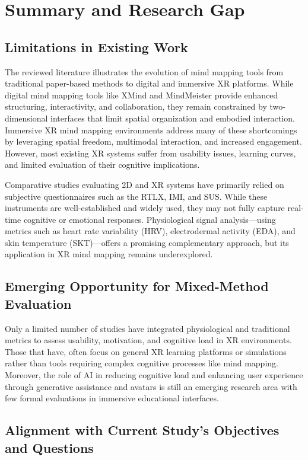 \documentclass{CPP}
\begin{document}
\section{Summary and Research Gap}

\subsection{Limitations in Existing Work}

The reviewed literature illustrates the evolution of mind mapping tools from traditional paper-based methods to digital and immersive XR platforms. While digital mind mapping tools like XMind and MindMeister provide enhanced structuring, interactivity, and collaboration, they remain constrained by two-dimensional interfaces that limit spatial organization and embodied interaction. Immersive XR mind mapping environments address many of these shortcomings by leveraging spatial freedom, multimodal interaction, and increased engagement. However, most existing XR systems suffer from usability issues, learning curves, and limited evaluation of their cognitive implications.

Comparative studies evaluating 2D and XR systems have primarily relied on subjective questionnaires such as the RTLX, IMI, and SUS. While these instruments are well-established and widely used, they may not fully capture real-time cognitive or emotional responses. Physiological signal analysis—using metrics such as heart rate variability (HRV), electrodermal activity (EDA), and skin temperature (SKT)—offers a promising complementary approach, but its application in XR mind mapping remains underexplored.

\subsection{Emerging Opportunity for Mixed-Method Evaluation}

Only a limited number of studies have integrated physiological and traditional metrics to assess usability, motivation, and cognitive load in XR environments. Those that have, often focus on general XR learning platforms or simulations rather than tools requiring complex cognitive processes like mind mapping. Moreover, the role of AI in reducing cognitive load and enhancing user experience through generative assistance and avatars is still an emerging research area with few formal evaluations in immersive educational interfaces.

\subsection{Alignment with Current Study’s Objectives and Questions}
\end{document}
